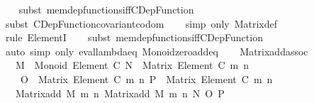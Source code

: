 \begin{isabellebody}
\ \ \isamarkupfalse%
\ {\isacharparenleft}{\kern0pt}subst\ mem{\isacharunderscore}{\kern0pt}dep{\isacharunderscore}{\kern0pt}functions{\isacharunderscore}{\kern0pt}iff{\isacharunderscore}{\kern0pt}CDep{\isacharunderscore}{\kern0pt}Function{\isacharparenright}{\kern0pt}\isanewline
\ \ \isamarkupfalse%
\ {\isacharparenleft}{\kern0pt}subst\ CDep{\isacharunderscore}{\kern0pt}Function{\isacharunderscore}{\kern0pt}covariant{\isacharunderscore}{\kern0pt}codom{\isacharparenright}{\kern0pt}\isanewline
\ \ \isamarkupfalse%
\ {\isacharparenleft}{\kern0pt}simp\ only{\isacharcolon}{\kern0pt}\ Matrix{\isacharunderscore}{\kern0pt}def{\isacharparenright}{\kern0pt}\isanewline
\ \ \isamarkupfalse%
\ {\isacharparenleft}{\kern0pt}rule\ ElementI{\isacharparenright}{\kern0pt}\isanewline
\ \ \isamarkupfalse%
\ {\isacharparenleft}{\kern0pt}subst\ mem{\isacharunderscore}{\kern0pt}dep{\isacharunderscore}{\kern0pt}functions{\isacharunderscore}{\kern0pt}iff{\isacharunderscore}{\kern0pt}CDep{\isacharunderscore}{\kern0pt}Function{\isacharparenright}{\kern0pt}\isanewline
\ \ \isamarkupfalse%
\ {\isacharparenleft}{\kern0pt}auto\ simp\ only{\isacharcolon}{\kern0pt}\ eval{\isacharunderscore}{\kern0pt}lambda{\isacharunderscore}{\kern0pt}eq\ Monoid{\isacharunderscore}{\kern0pt}zero{\isacharunderscore}{\kern0pt}add{\isacharunderscore}{\kern0pt}eq{\isacharparenright}{\kern0pt}\isanewline
\ \ \isamarkupfalse%
%
\endisatagproof
{\isafoldproof}%
%
\isadelimproof
\isanewline
%
\endisadelimproof
\isanewline
\isanewline
{}\isamarkupfalse%
\ Matrix{\isacharunderscore}{\kern0pt}add{\isacharunderscore}{\kern0pt}assoc{\isacharcolon}{\kern0pt}\isanewline
\ \ \ {\isachardoublequoteopen}M\ {\isacharcolon}{\kern0pt}\ Monoid\ {\isacharparenleft}{\kern0pt}Element\ C{\isacharparenright}{\kern0pt}{\isachardoublequoteclose}\ {\isachardoublequoteopen}N\ {\isacharcolon}{\kern0pt}\ Matrix\ {\isacharparenleft}{\kern0pt}Element\ C{\isacharparenright}{\kern0pt}\ m\ n{\isachardoublequoteclose}\isanewline
\ \ \ \ {\isachardoublequoteopen}O\ {\isacharcolon}{\kern0pt}\ Matrix\ {\isacharparenleft}{\kern0pt}Element\ C{\isacharparenright}{\kern0pt}\ m\ n{\isachardoublequoteclose}\ {\isachardoublequoteopen}P\ {\isacharcolon}{\kern0pt}\ Matrix\ {\isacharparenleft}{\kern0pt}Element\ C{\isacharparenright}{\kern0pt}\ m\ n{\isachardoublequoteclose}\isanewline
\ \ \ {\isachardoublequoteopen}Matrix{\isacharunderscore}{\kern0pt}add\ M\ m\ n\ {\isacharparenleft}{\kern0pt}Matrix{\isacharunderscore}{\kern0pt}add\ M\ m\ n\ N\ O{\isacharparenright}{\kern0pt}\ P\ {\isacharequal}{\kern0pt}\isanewline

\end{isabellebody}
